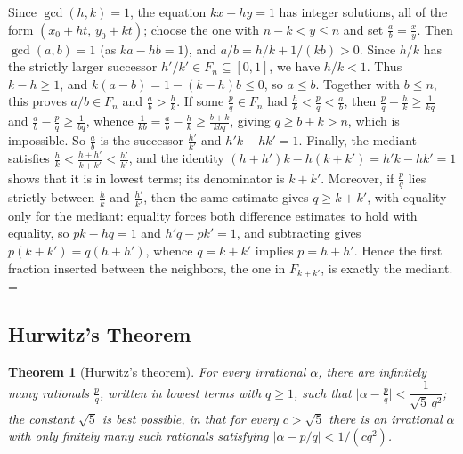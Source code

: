 \documentclass[11pt]{article}
\makeatletter
\theoremstyle{ntstyle}
\newtheorem{theorem}{Theorem}[subsection]
\let\nt@closedisplay\]
\def\nt@guardedclose{\@ifnextchar\par{\nt@closeafterpar}{\@ifnextchar\end{\postdisplaypenalty\@M\nt@closedisplay}{\nt@closedisplay}}}
\def\nt@closeafterpar\par{\@ifnextchar\par{\nt@closeafterpar}{\@ifnextchar\end{\postdisplaypenalty\@M\nt@closedisplay\par}{\nt@closedisplay\par}}}
\renewenvironment{proof}[1][\proofname]{\par
  \pushQED{\qed}\normalfont\topsep\medskipamount\edef\nt@afterproof{\@endparpenalty=\the\@endparpenalty\relax}\@beginparpenalty\@M\@endparpenalty\@M\let\]\nt@guardedclose\trivlist\item[]\textit{#1\@addpunct{.}} \ignorespaces}{\ifvmode\addpenalty\@M\fi\popQED\nt@afterproof\endtrivlist\@endpefalse}
\makeatother
\begin{document}
\begin{proof} Since $\gcd(h, k)=1$, the equation $kx-hy=1$
	has integer solutions, all of the form $(x_0+ht,\,y_0+kt)$; choose
	the one with $n-k<y\le n$ and set $\tfrac{a}{b}=\tfrac{x}{y}$. Then
	$\gcd(a, b)=1$ (as $ka-hb=1$), and $a/b=h/k+1/(kb)>0$. Since $h/k$ has the strictly larger
	successor $h'/k'\in F_n\subseteq[0,1]$,
	we have $h/k<1$. Thus $k-h\ge1$, and $k(a-b)=1-(k-h)b\le0$, so $a\le b$. Together with $b\le n$,
	this proves $a/b\in F_n$ and $\tfrac{a}{b}>\tfrac{h}{k}$. If some $\tfrac{p}{q}\in F_n$ had
	$\tfrac{h}{k}<\tfrac{p}{q}<\tfrac{a}{b}$, then $\tfrac{p}{q}-\tfrac{h}{k}\ge\tfrac{1}{kq}$ and
	$\tfrac{a}{b}-\tfrac{p}{q}\ge\tfrac{1}{bq}$, whence
	$\tfrac{1}{kb}=\tfrac{a}{b}-\tfrac{h}{k}\ge\tfrac{b+k}{kbq}$, giving $q\ge
		b+k>n$, which is impossible. So $\tfrac{a}{b}$ is the successor
	$\tfrac{h'}{k'}$ and $h'k-hk'=1$. Finally, the mediant satisfies
	$\tfrac{h}{k}<\tfrac{h+h'}{k+k'}<\tfrac{h'}{k'}$, and the identity
	$(h+h')k-h(k+k')=h'k-hk'=1$ shows that it is in lowest terms; its
	denominator is $k+k'$. Moreover, if $\tfrac{p}{q}$ lies strictly between
	$\tfrac{h}{k}$ and $\tfrac{h'}{k'}$, then the same estimate gives
	$q\ge k+k'$, with equality only for the mediant: equality forces both
	difference estimates to hold with equality, so $pk-hq=1$ and $h'q-pk'=1$, and
	subtracting gives $p(k+k')=q(h+h')$, whence $q=k+k'$ implies $p=h+h'$.
	Hence the first
	fraction inserted between the neighbors, the one in $F_{k+k'}$, is
	exactly the mediant.
\end{proof}
\subsection{Hurwitz's Theorem}

\begin{theorem}[Hurwitz's theorem]\label{thm:10.5.1} For every irrational
	$\alpha$, there are infinitely many rationals $\tfrac{p}{q}$, written in
	lowest terms with $q\ge1$, such that
	$\big|\alpha-\tfrac{p}{q}\big|<\dfrac{1}{\sqrt{5}\,q^2}$; the constant
	$\sqrt{5}$ is best possible, in that for every $c>\sqrt5$ there is an irrational $\alpha$ with
	only finitely many such rationals satisfying $|\alpha-p/q|<1/(cq^2)$.
\end{theorem}
\end{document}
